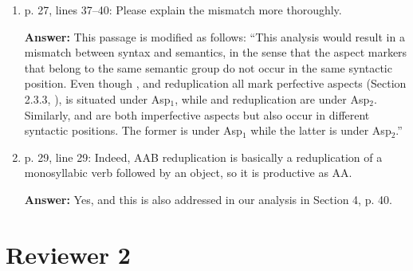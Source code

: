\documentclass[fleqn,twoside]{article}
\begin{document}
\begin{enumerate}
\item p. 27, lines 37--40: Please explain the mismatch more thoroughly.

\noindent
\textbf{Answer:} This passage is modified as follows: 
``This analysis would result in a mismatch between syntax and semantics, 
in the sense that the aspect markers that belong to the same semantic group do not occur in the same syntactic position. 
Even though ,  and reduplication all mark perfective aspects (Section 2.3.3, \citealt{Dai1997, XiaoMcEnery2004}),
 is situated under Asp$_1$, while  and reduplication are under Asp$_2$.
Similarly,  and  are both imperfective aspects but also occur in different syntactic positions.
The former is under Asp$_1$ while the latter is under Asp$_2$.''

\item p. 29, line 29: Indeed, AAB reduplication is basically a reduplication of a monosyllabic verb followed
by an object, so it is productive as AA.

\noindent
\textbf{Answer:} Yes, and this is also addressed in our analysis in Section 4, p. 40.

\end{enumerate}

\section{Reviewer 2}\label{sec:2}
\end{document}
